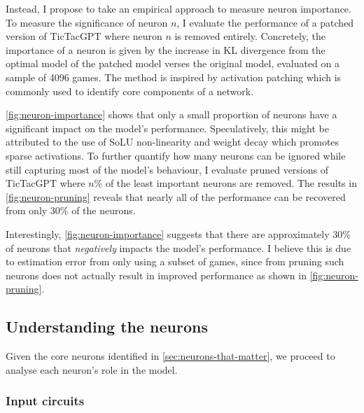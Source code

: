 \documentclass{article}
\newcommand{\ttgpt}{TicTacGPT\xspace}
\begin{document}
Instead, I propose to take an empirical approach to measure neuron importance. To measure the significance of neuron $n$, I evaluate the performance of a patched version of \ttgpt where neuron $n$ is removed entirely. Concretely, the importance of a neuron is given by the increase in KL divergence from the optimal model of the patched model verses the original model, evaluated on a sample of 4096 games. The method is inspired by activation patching \citep{meng2022locating,vig2020investigating} which is commonly used to identify core components of a network.

\cref{fig:neuron-importance} shows that only a small proportion of neurons have a significant impact on the model's performance. Speculatively, this might be attributed to the use of SoLU non-linearity and weight decay which promotes sparse activations. To further quantify how many neurons can be ignored while still capturing most of the model's behaviour, I evaluate pruned versions of \ttgpt where $n\%$ of the least important neurons are removed. The results in \cref{fig:neuron-pruning} reveals that nearly all of the performance can be recovered from only 30\% of the neurons.

Interestingly, \cref{fig:neuron-importance} suggests that there are
approximately $30\%$ of neurons that \emph{negatively} impacts the model's performance. I believe this is due to estimation error from only using a subset of games, since from pruning such neurons does not actually result in improved performance as shown in \cref{fig:neuron-pruning}.

\subsection{Understanding the neurons} \label{sec:neurons-visualisation}

Given the core neurons identified in \cref{sec:neurons-that-matter}, we proceed to analyse each neuron's role in the model.

\subsubsection{Input circuits}
\end{document}

